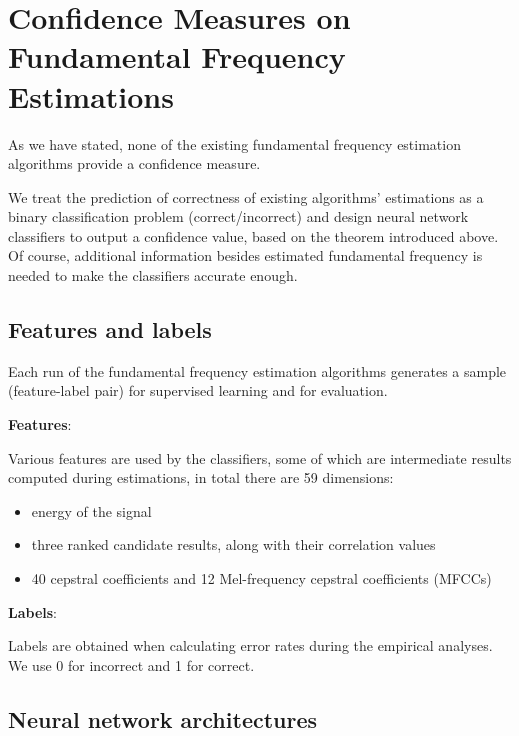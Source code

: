 \documentclass[11pt,a4paper]{report}
\begin{document}
\chapter{Confidence Measures on Fundamental Frequency Estimations}

As we have stated, none of the existing fundamental frequency estimation algorithms provide a confidence measure.

We treat the prediction of correctness of existing algorithms' estimations as a binary classification problem (correct/incorrect) and design neural network classifiers to output a confidence value, based on the theorem introduced above.
Of course, additional information besides estimated fundamental frequency is needed to make the classifiers accurate enough.

\section{Features and labels}

Each run of the fundamental frequency estimation algorithms generates a sample (feature-label pair) for supervised learning and for evaluation.

\begin{mdframed}
\noindent \textbf{Features}:

Various features are used by the classifiers, some of which are intermediate results computed during estimations, in total there are 59 dimensions:

\begin{itemize}
  \item energy of the signal
  \item three ranked candidate results, along with their correlation values
  \item 40 cepstral coefficients and 12 Mel-frequency cepstral coefficients (MFCCs) \parencite{mermelstein1976distance,davis1980comparison}
\end{itemize}

\noindent \textbf{Labels}:

Labels are obtained when calculating error rates during the empirical analyses.
We use 0 for incorrect and 1 for correct.
\end{mdframed}

\newpage

\section{Neural network architectures}
\end{document}
